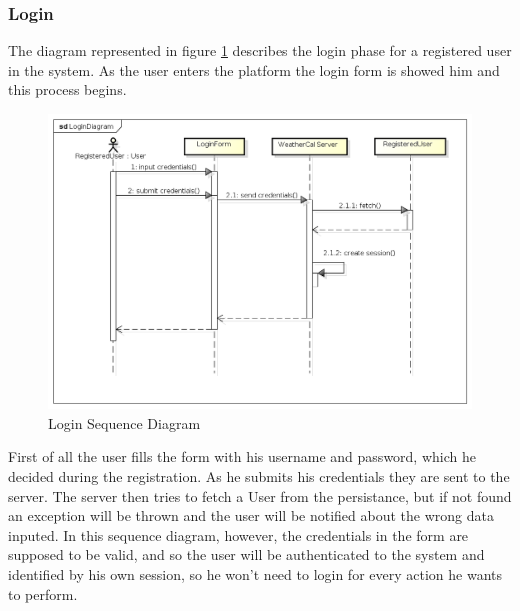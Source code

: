 \subsubsection{Login}
The diagram represented in figure \ref{fig:logseqdiag} describes the login phase for a registered user in the system. As the user enters the platform the login form is showed him and this process begins.
\begin{center}
 \begin{figure}[H]
    \includegraphics[width=1\textwidth]{../UMLDiagram/sequence/LoginDiagram/LoginDiagram.png}
    \caption{Login Sequence Diagram}
     \label{fig:logseqdiag}
     \end{figure}
   \end{center}
First of all the user fills the form with his username and password, which he decided during the registration. As he submits his credentials they are sent to the server. The server then tries to fetch a User from the persistance, but if not found an exception will be thrown and the user will be notified about the wrong data inputed. In this sequence diagram, however, the credentials in the form are supposed to be valid, and so the user will be authenticated to the system and identified by his own session, so he won't need to login for every action he wants to perform.

